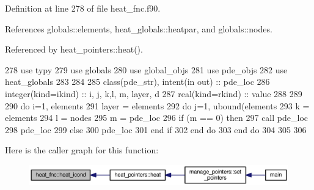 Definition at line 278 of file heat\+\_\+fnc.\+f90.



References globals\+::elements, heat\+\_\+globals\+::heatpar, and globals\+::nodes.



Referenced by heat\+\_\+pointers\+::heat().


\begin{DoxyCode}
278       \textcolor{keywordtype}{use }typy
279       \textcolor{keywordtype}{use }globals
280       \textcolor{keywordtype}{use }global_objs
281       \textcolor{keywordtype}{use }pde_objs
282       \textcolor{keywordtype}{use }heat_globals
283 
284       
285       \textcolor{keywordtype}{class}(pde_str), \textcolor{keywordtype}{intent(in out)} :: pde\_loc
286       \textcolor{keywordtype}{integer(kind=ikind)} :: i, j, k,l, m, layer, d
287       \textcolor{keywordtype}{real(kind=rkind)} :: value
288       
289    
290       \textcolor{keywordflow}{do} i=1, elements%
291         layer = elements%
292         \textcolor{keywordflow}{do} j=1, ubound(elements%
293           k = elements%
294           l = nodes%
295           m = pde\_loc%
296           \textcolor{keywordflow}{if} (m == 0) \textcolor{keywordflow}{then}
297             \textcolor{keyword}{call }pde\_loc%
298             pde\_loc%
299           \textcolor{keywordflow}{else}
300             pde\_loc%
301 \textcolor{keywordflow}{          end if}
302 \textcolor{keywordflow}{        end do}   
303 \textcolor{keywordflow}{      end do}
304 
305     
306     
\end{DoxyCode}


Here is the caller graph for this function\+:\nopagebreak
\begin{figure}[H]
\begin{center}
\leavevmode
\includegraphics[width=350pt]{namespaceheat__fnc_ad72ac4afafcfc39183bd8b087a92bb6d_icgraph}
\end{center}
\end{figure}



